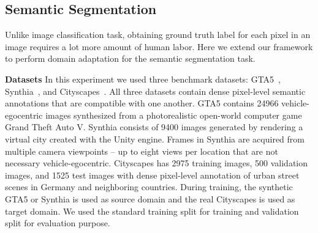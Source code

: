 \documentclass[10pt,twocolumn,letterpaper]{article}
\begin{document}
\subsection{Semantic Segmentation}
Unlike image classification task, obtaining ground truth label for each pixel in an image requires a lot more amount of human labor. Here we extend our framework to perform domain adaptation for the semantic segmentation task.

\vspace{2mm}
\noindent \textbf{Datasets}
In this experiment we used three benchmark datasets: GTA5~\cite{richter2016playing}, Synthia~\cite{ros2016synthia}, and Cityscapes~\cite{cordts2016cityscapes}. All three datasets contain dense pixel-level semantic annotations that are compatible with one another. GTA5 contains 24966 vehicle-egocentric images synthesized from a photorealistic open-world computer game Grand Theft Auto V. Synthia consists of 9400 images generated by rendering a virtual city created with the Unity engine. Frames in Synthia are acquired from multiple camera viewpoints -- up to eight views per location that are not necessary vehicle-egocentric. Cityscapes has 2975 training images, 500 validation images, and 1525 test images with dense pixel-level annotation of urban street scenes in Germany and neighboring countries. During training, the synthetic GTA5 or Synthia is used as source domain and the real Cityscapes is used as target domain. We used the standard training split for training and validation split for evaluation purpose.


\begin{table*}[tbp]
\setlength{\tabcolsep}{4pt}
\begin{center}
  \end{center}
   \vspace{-6mm}
     \caption{Results of unsupervised domain adaptation on VisDA 2018~\cite{peng2018syn2real} object detection track. This task evaluates the adaptation capability from synthetic CAD model images to real-world MSCOCO images (COCO17-val). We report mean average precision (mAP) at 0.5 IoU using SSD with Inception-V2 backbone. Our method outperforms the direct comparable method MCD~\cite{saito2017maximum} by 25\% relatively.}
      \label{tb:detection}
      \vspace{-3mm}
\end{table*}
\end{document}
